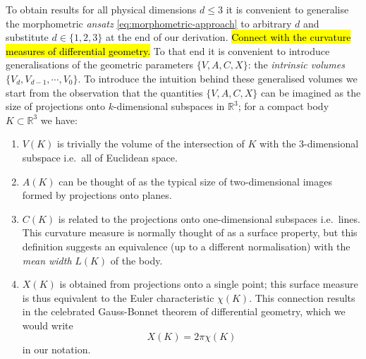 To obtain results for all physical dimensions $d \le 3$ it is convenient to generalise the morphometric \emph{ansatz} \eqref{eq:morphometric-approach} to arbitrary $d$ and substitute $d \in \{1, 2, 3\}$ at the end of our derivation.
\hl{Connect with the curvature measures of differential geometry.}
To that end it is convenient to introduce generalisations of the geometric parameters $\{V,A,C,X\}$: the \emph{intrinsic volumes} $\{V_d, V_{d-1}, \cdots, V_0\}$.
To introduce the intuition behind these generalised volumes we start from the observation that the quantities $\{V,A,C,X\}$ can be imagined as the size of projections onto $k$-dimensional subspaces in $\mathbb{R}^3$; for a compact body $K \subset \mathbb{R}^3$ we have:
\begin{enumerate}
\item $V(K)$ is trivially the volume of the intersection of $K$ with the 3-dimensional subspace i.e.\ all of Euclidean space.
\item $A(K)$ can be thought of as the typical size of two-dimensional images formed by projections onto planes.
\item $C(K)$ is related to the projections onto one-dimensional subspaces i.e.\ lines.
  This curvature measure is normally thought of as a surface property, but this definition suggests an equivalence (up to a different normalisation) with the \emph{mean width} $L(K)$ of the body.
\item $X(K)$ is obtained from projections onto a single point; this surface measure is thus equivalent to the Euler characteristic $\chi(K)$.
  This connection results in the celebrated Gauss-Bonnet theorem of differential geometry, which we would write
  \begin{equation*}
    X(K) = 2\pi \chi(K)
  \end{equation*}
  in our notation.
\end{enumerate}

